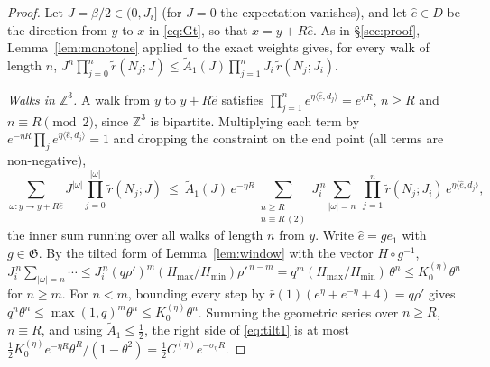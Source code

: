 \documentclass[11pt,a4paper]{article}
\theoremstyle{plain}
\theoremstyle{remark}
\numberwithin{equation}{section}
\newcommand{\Z}{\mathbb{Z}}
\newcommand{\At}{\widetilde A}
\newcommand{\rt}{\widetilde r}
\newcommand{\rb}{\bar r}
\begin{document}
\begin{proof}
Let $J=\beta/2\in(0,J_i]$ (for $J=0$ the expectation vanishes), and let $\hat e\in D$ be the direction from $y$ to $x$ in \eqref{eq:Gt},
so that $x=y+R\hat e$. As in \S\ref{sec:proof}, Lemma~\ref{lem:monotone} applied to the exact weights gives, for every walk of length $n$,
$J^{n}\prod_{j=0}^{n}\rt(N_j;J)\le\At_1(J)\prod_{j=1}^{n}J_i\,\rt(N_j;J_i)$.

\emph{Walks in $\Z^3$.} A walk from $y$ to $y+R\hat e$ satisfies $\prod_{j=1}^{n}e^{\eta\langle\hat e,d_j\rangle}=e^{\eta R}$, $n\ge R$ and
$n\equiv R\pmod2$, since $\Z^3$ is bipartite. Multiplying each term by $e^{-\eta R}\prod_je^{\eta\langle\hat e,d_j\rangle}=1$ and dropping
the constraint on the end point (all terms are non-negative),
\begin{equation}\label{eq:tilt1}
\sum_{\omega:y\to y+R\hat e}J^{|\omega|}\prod_{j=0}^{|\omega|}\rt(N_j;J)\ \le\ \At_1(J)\,e^{-\eta R}\sum_{\substack{n\ge R\\ n\equiv R\,(2)}}
J_i^{\,n}\sum_{|\omega|=n}\ \prod_{j=1}^{n}\rt(N_j;J_i)\,e^{\eta\langle\hat e,d_j\rangle},
\end{equation}
the inner sum running over all walks of length $n$ from $y$. Write $\hat e=ge_1$ with $g\in\mathfrak G$. By the tilted form of
Lemma~\ref{lem:window} with the vector $H\circ g^{-1}$, $J_i^{\,n}\sum_{|\omega|=n}\cdots\le J_i^{\,n}(q\rho')^m(H_{\max}/H_{\min})\rho'^{\,n-m}=
q^m(H_{\max}/H_{\min})\,\theta^n\le K_0^{(\eta)}\theta^n$ for $n\ge m$. For $n<m$, bounding every step by $\rb(1)(e^\eta+e^{-\eta}+4)=q\rho'$
gives $q^n\theta^n\le\max(1,q)^m\theta^n\le K_0^{(\eta)}\theta^n$. Summing the geometric series over $n\ge R$, $n\equiv R$, and using
$\At_1\le\frac12$, the right side of \eqref{eq:tilt1} is at most $\frac12K_0^{(\eta)}e^{-\eta R}\theta^R/(1-\theta^2)=
\frac12C^{(\eta)}e^{-\sigma_\eta R}$.


\end{proof}
\end{document}
